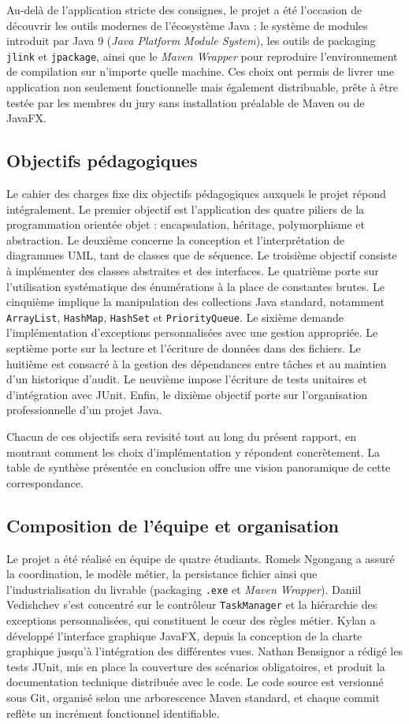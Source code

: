 \documentclass[11pt]{article}
\begin{document}
Au-delà de l'application stricte des consignes, le projet a été l'occasion
de découvrir les outils modernes de l'écosystème Java : le système de
modules introduit par Java 9 (\textit{Java Platform Module System}), les
outils de packaging \texttt{jlink} et \texttt{jpackage}, ainsi que le
\textit{Maven Wrapper} pour reproduire l'environnement de compilation sur
n'importe quelle machine. Ces choix ont permis de livrer une application
non seulement fonctionnelle mais également distribuable, prête à être
testée par les membres du jury sans installation préalable de Maven ou de
JavaFX.

\subsection{Objectifs pédagogiques}
Le cahier des charges fixe dix objectifs pédagogiques auxquels le projet
répond intégralement. Le premier objectif est l'application des quatre
piliers de la programmation orientée objet : encapsulation, héritage,
polymorphisme et abstraction. Le deuxième concerne la conception et
l'interprétation de diagrammes UML, tant de classes que de séquence. Le
troisième objectif consiste à implémenter des classes abstraites et des
interfaces. Le quatrième porte sur l'utilisation systématique des
énumérations à la place de constantes brutes. Le cinquième implique la
manipulation des collections Java standard, notamment \texttt{ArrayList},
\texttt{HashMap}, \texttt{HashSet} et \texttt{PriorityQueue}. Le sixième
demande l'implémentation d'exceptions personnalisées avec une gestion
appropriée. Le septième porte sur la lecture et l'écriture de données dans
des fichiers. Le huitième est consacré à la gestion des dépendances entre
tâches et au maintien d'un historique d'audit. Le neuvième impose
l'écriture de tests unitaires et d'intégration avec JUnit. Enfin, le
dixième objectif porte sur l'organisation professionnelle d'un projet Java.

Chacun de ces objectifs sera revisité tout au long du présent rapport, en
montrant comment les choix d'implémentation y répondent concrètement. La
table de synthèse présentée en conclusion offre une vision panoramique de
cette correspondance.

\subsection{Composition de l'équipe et organisation}
Le projet a été réalisé en équipe de quatre étudiants. Romels Ngongang a
assuré la coordination, le modèle métier, la persistance fichier ainsi que
l'industrialisation du livrable (packaging \texttt{.exe} et \textit{Maven
Wrapper}). Daniil Vedishchev s'est concentré sur le contrôleur
\texttt{TaskManager} et la hiérarchie des exceptions personnalisées, qui
constituent le c\oe ur des règles métier. Kylan a développé l'interface
graphique JavaFX, depuis la conception de la charte graphique jusqu'à
l'intégration des différentes vues. Nathan Bensignor a rédigé les tests
JUnit, mis en place la couverture des scénarios obligatoires, et produit
la documentation technique distribuée avec le code. Le code source est
versionné sous Git, organisé selon une arborescence Maven standard, et
chaque commit reflète un incrément fonctionnel identifiable.
\end{document}
